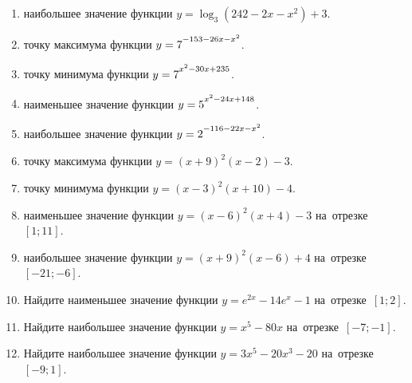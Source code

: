 \documentclass[a4paper,10pt]{article}
\begin{document}
\begin{enumerate}
\item {} наибольшее значение функции $y=\log_3\left(242-2x-x^2\right)+3$.

\item {} точку максимума функции $y=7\strut^{-153-26x-x^2}$.

\item {} точку минимума функции $y=7\strut^{x^2-30x+235}$.

\item {} наименьшее значение функции $y=5\strut^{x^2-24x+148}$.

\item {} наибольшее значение функции $y=2\strut^{-116-22x-x^2}$.

\item {} точку максимума функции $y=\left(x+9\right)^2\left(x-2\right)-3$.

\item {} точку минимума функции $y=\left(x-3\right)^2\left(x+10\right)-4$.

\item {} наименьшее значение функции $y=\left(x-6\right)^2\left(x+4\right)-3$ на~отрезке~$\left[1;11\right]$.

\item {} наибольшее значение функции $y=\left(x+9\right)^2\left(x-6\right)+4$ на~отрезке~$\left[-21;-6\right]$.

\item Найдите наименьшее значение функции $y=e^{2x}-14e^x-1$ на~отрезке~$\left[1;2\right]$.

\item Найдите наибольшее значение функции $y=x^5-80x$ на~отрезке~$\left[-7;-1\right]$.

\item Найдите наибольшее значение функции $y=3x^5-20x^3-20$ на~отрезке~$\left[-9;1\right]$.

\end{enumerate}
\end{document}

